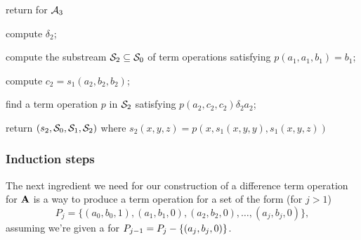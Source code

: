 \LinesNumbered
\begin{algorithm}

  \caption{return \ldto for $\mathcal{A}_3$
  \label{alg:stream-ldt3}  }

compute $\delta_2$;

compute the substream $\mathcal{S}_2 \subseteq \mathcal{S}_0$ of term operations satisfying
 $p(a_1,a_1,b_1) = b_1$;

compute $c_2 = s_1(a_2, b_2, b_2)$;

find a term operation $p$ in $\mathcal{S}_2$ satisfying
$p(a_2, c_2, c_2) \mathrel{\delta_2} a_2$;

return $(s_2, \mathcal{S}_0, \mathcal{S}_1, \mathcal{S}_2)$ where $s_2(x,y,z) = p(x, s_1(x,y,y), s_1(x,y,z))$
\end{algorithm}



















\subsubsection{Induction steps}
\label{sec:induct}

The next ingredient we need for our construction of a
difference term operation for $\mathbf{A}$
is
a way to produce a \ld
term operation for a set of the form  (for $j>1$)
\begin{equation}
\label{eqn:Pj}
P_j = \{(a_0, b_0, 1), (a_1, b_1, 0), (a_2, b_2, 0), \dots,
(a_j, b_j, 0)\},
\end{equation}
assuming we're given a \ldto for $P_{j-1} = P_{j} - \{(a_j, b_j, 0)\}$.


\begin{comment}
\noindent \underline{\bf Subroutine \ild-0}\\[4pt]
The input, $p$,  is
a \ldto for $P_{j-1} = P_{j} \mysetminus \{(a_j, b_j, 0)\}$.
\begin{enumerate}[1.]
\item
Call Subroutine \ld-2 to
compute a \ldto $t$ for the set
\begin{equation*}
\{(a_0, b_0, 1), (a_j, p(a_j, b_j, b_j), 0)\}.
\end{equation*}
\item Return the following
\ldto for $P_j$:
\begin{equation}
d(x,y,z) = t(x, p(x,y,y), p(x,y,z)).
\label{eq:idl0-dto}
\end{equation}
\end{enumerate}
\qed
\end{comment}




